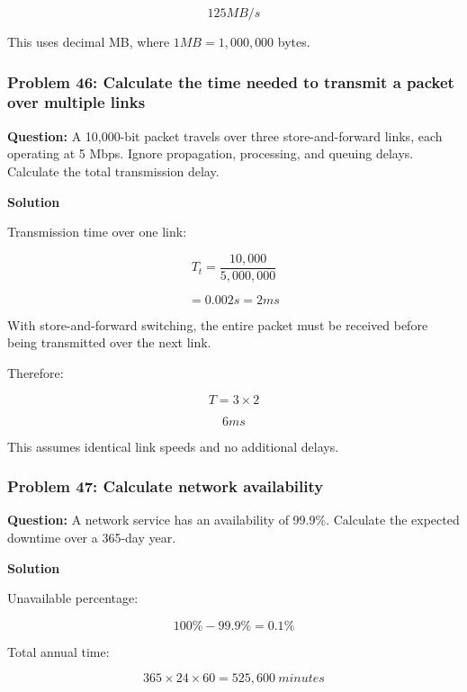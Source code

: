 \[
\boxed{125MB/s}
\]



This uses decimal MB, where $1MB=1,000,000$ bytes.

\subsubsection*{Problem 46: Calculate the time needed to transmit a packet over multiple links}

\textbf{Question:} A 10,000-bit packet travels over three store-and-forward links, each operating at 5 Mbps. Ignore propagation, processing, and queuing delays. Calculate the total transmission delay.

\textbf{Solution}

Transmission time over one link:



\[
T_t=\frac{10,000}{5,000,000}
\]





\[
=0.002s=2ms
\]



With store-and-forward switching, the entire packet must be received before being transmitted over the next link.

Therefore:



\[
T=3\times2
\]





\[
\boxed{6ms}
\]



This assumes identical link speeds and no additional delays.

\subsubsection*{Problem 47: Calculate network availability}

\textbf{Question:} A network service has an availability of 99.9\%. Calculate the expected downtime over a 365-day year.

\textbf{Solution}

Unavailable percentage:



\[
100\%-99.9\%=0.1\%
\]



Total annual time:



\[
365\times24\times60=525,600\ minutes
\]



